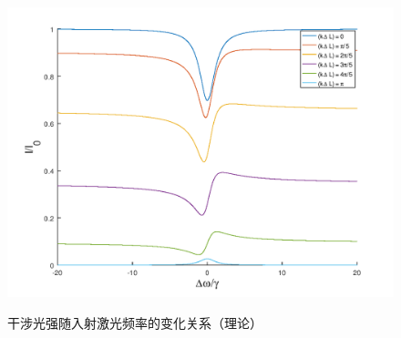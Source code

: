 \documentclass[a4paper, 10pt]{article}
\begin{document}
\begin{multicols}{2}
\begin{figure}[H]
{    \includegraphics[width=0.9\columnwidth]{OutputWithCell-1.png}}
    \caption{干涉光强随入射激光频率的变化关系（理论）}
    \label{output-with-cell}
\end{figure}


\end{multicols}
\end{document}
